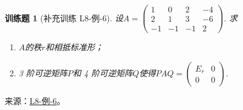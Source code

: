 \documentclass[12pt,fontset=fandol]{ctexart}
\newtheorem{exercise}{训练题}[section]
\begin{document}
\begin{exercise}[补充训练 L8-例-6]\label{prob:L8-例-6}
设$A=\begin{pmatrix}
            1 & 0 & 2 & -4 \\ 2 & 1 & 3 & -6 \\ -1 & -1 & -1 & 2
        \end{pmatrix}$. 求
    \begin{enumerate}[label=(\arabic*)]
        \item $A$的秩$r$和相抵标准形；

        \item
              3 阶可逆矩阵$P$和 4 阶可逆矩阵$Q$使得$PAQ=\begin{pmatrix}
                      E_r & 0 \\ 0 & 0
                  \end{pmatrix}$.
    \end{enumerate}
\end{exercise}
\noindent 来源：\href{https://github.com/yhwu-is/Linear-Algebra-Left-Undone/blob/new/%E8%AE%B2%E4%B9%89/%E4%B8%93%E9%A2%98/8%20%E7%9B%B8%E6%8A%B5%E6%A0%87%E5%87%86%E5%BD%A2.tex}{L8-例-6}。
\end{document}
